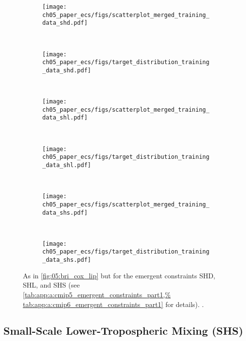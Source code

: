 \begin{figure}[!t]
  \centering
  \begin{subfigure}[b]{\SubfigureWidth{}}
    \texttt{[image: 
      ch05\_paper\_ecs/figs/scatterplot\_merged\_training\_data\_shd.pdf]}
    \caption{}
    \label{fig:05:shd_shl_shs:a}
  \end{subfigure}
  ~
  \begin{subfigure}[b]{\SubfigureWidth{}}
    \texttt{[image: 
      ch05\_paper\_ecs/figs/target\_distribution\_training\_data\_shd.pdf]}
    \caption{}
    \label{fig:05:shd_shl_shs:b}
  \end{subfigure}
  \\
  \begin{subfigure}[b]{\SubfigureWidth{}}
    \texttt{[image: 
      ch05\_paper\_ecs/figs/scatterplot\_merged\_training\_data\_shl.pdf]}
    \caption{}
    \label{fig:05:shd_shl_shs:c}
  \end{subfigure}
  ~
  \begin{subfigure}[b]{\SubfigureWidth{}}
    \texttt{[image: 
      ch05\_paper\_ecs/figs/target\_distribution\_training\_data\_shl.pdf]}
    \caption{}
    \label{fig:05:shd_shl_shs:d}
  \end{subfigure}
  \\
  \begin{subfigure}[b]{\SubfigureWidth{}}
    \texttt{[image: 
      ch05\_paper\_ecs/figs/scatterplot\_merged\_training\_data\_shs.pdf]}
    \caption{}
    \label{fig:05:shd_shl_shs:e}
  \end{subfigure}
  ~
  \begin{subfigure}[b]{\SubfigureWidth{}}
    \texttt{[image: 
      ch05\_paper\_ecs/figs/target\_distribution\_training\_data\_shs.pdf]}
    \caption{}
    \label{fig:05:shd_shl_shs:f}
  \end{subfigure}
  \caption[
    As in \cref{fig:05:bri_cox_lip} but for the emergent constraints SHD, SHL,
    and SHS.
  ]{
    As in \cref{fig:05:bri_cox_lip} but for the emergent constraints SHD, SHL,
    and SHS (see \cref{tab:app:a:cmip5_emergent_constraints_part1,%
      tab:app:a:cmip6_emergent_constraints_part1} for details).
    .
  }
  \label{fig:05:shd_shl_shs}
\end{figure}


\subsection{Small-Scale Lower-Tropospheric Mixing (SHS)}
\label{subsec:05:shs}

